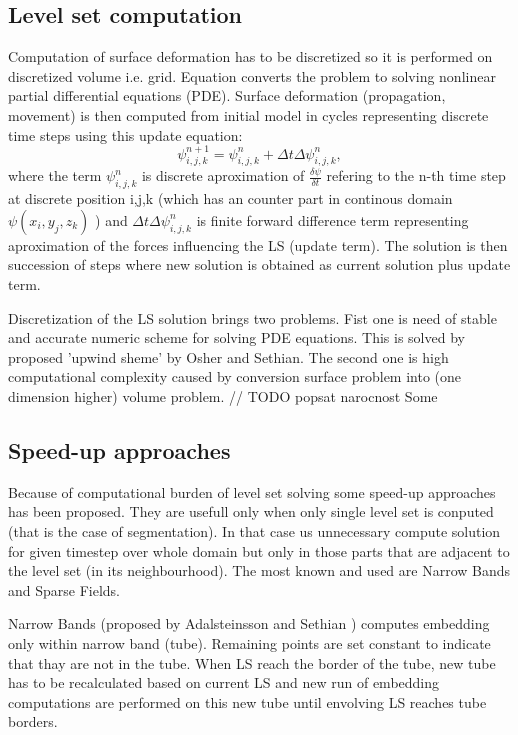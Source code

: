 \subsection{Level set computation}

Computation of surface deformation has to be discretized so it is performed on discretized volume i.e. grid. Equation converts the problem to solving nonlinear partial differential equations (PDE). Surface deformation (propagation, movement) is then computed from initial model in cycles representing discrete time steps using this update equation:
\begin{equation}
\psi_{i,j,k}^{n+1} = \psi_{i,j,k}^{n} + \Delta t \Delta \psi_{i,j,k}^{n},
\end{equation}
where the term $\psi_{i,j,k}^{n}$ is discrete aproximation of $\frac{\delta\psi}{\delta t}$ refering to the n-th time step at discrete position i,j,k (which has an counter part in continous domain $\psi(x_i, y_j, z_k)$ ) and $\Delta t \Delta \psi_{i,j,k}^{n}$ is finite forward difference term representing aproximation of the forces influencing the LS (update term). The solution is then succession of steps where new solution is obtained as current solution plus update term.

Discretization of the LS solution brings two problems. Fist one is need of stable and accurate numeric scheme for solving PDE equations. This is solved by proposed 'upwind sheme' by Osher and Sethian. The second one is high computational complexity caused by conversion surface problem into (one dimension higher) volume problem. 
// TODO popsat narocnost
Some 

\subsection{Speed-up approaches}

Because of computational burden of level set solving some speed-up approaches has been proposed. They are usefull only when only single level set is conputed (that is the case of segmentation). In that case us unnecessary compute solution for given timestep over whole domain but only in those parts that are adjacent to the level set (in its neighbourhood). The most known and used are Narrow Bands and Sparse Fields. 

Narrow Bands (proposed by Adalsteinsson and Sethian \cite{sethianFastLS}) computes embedding only within narrow band (tube). Remaining points are set constant to indicate that thay are not in the tube. When LS reach the border of the tube, new tube has to be recalculated based on current LS and new run of embedding computations are performed on this new tube until envolving LS reaches tube borders.


